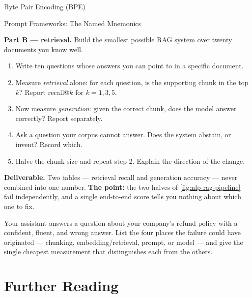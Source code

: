 \begin{v3topic}{Byte Pair Encoding (BPE)}
\begin{v3topic}{Prompt Frameworks: The Named Mnemonics}
\begin{practicallab}
\textbf{Part B --- retrieval.} Build the smallest possible RAG system over
twenty documents you know well.
\begin{enumerate}
  \item Write ten questions whose answers you can point to in a specific
        document.
  \item Measure \emph{retrieval} alone: for each question, is the supporting
        chunk in the top $k$? Report recall@$k$ for $k = 1, 3, 5$.
  \item Now measure \emph{generation}: given the correct chunk, does the model
        answer correctly? Report separately.
  \item Ask a question your corpus cannot answer. Does the system abstain, or
        invent? Record which.
  \item Halve the chunk size and repeat step 2. Explain the direction of the
        change.
\end{enumerate}

\textbf{Deliverable.} Two tables --- retrieval recall and generation accuracy
--- never combined into one number. \textbf{The point:} the two halves of
\cref{fig:nlp-rag-pipeline} fail independently, and a single end-to-end score
tells you nothing about which one to fix.
\end{practicallab}

\begin{checkpoint}
Your assistant answers a question about your company's refund policy with a
confident, fluent, and wrong answer. List the four places the failure could
have originated --- chunking, embedding/retrieval, prompt, or model --- and give
the single cheapest measurement that distinguishes each from the others.
\end{checkpoint}

\section{Further Reading}



\end{v3topic}
\end{v3topic}
